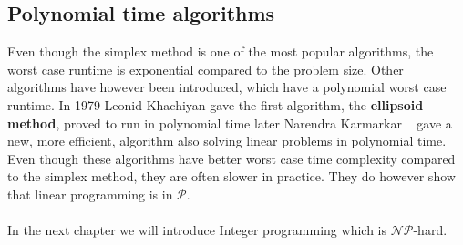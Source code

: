 \subsection{Polynomial time algorithms}\label{polynomial}
Even though the simplex method is one of the most popular algorithms, the worst case runtime is exponential compared to the problem size. Other algorithms have however been introduced, which have a polynomial worst case runtime. In 1979 Leonid Khachiyan \cite{khachiyan1980polynomial} gave the first algorithm, the \textbf{ellipsoid method}, proved to run in polynomial time later Narendra Karmarkar ~\cite{karmarkar1984new} gave a new, more efficient, algorithm also solving linear problems in polynomial time.
\\ Even though these algorithms have better worst case time complexity compared to the simplex method, they are often slower in practice. They do however show that linear programming is in $\mathcal{P}$.
\\\\ In the next chapter we will introduce Integer programming which is $\mathcal{NP}$-hard.
